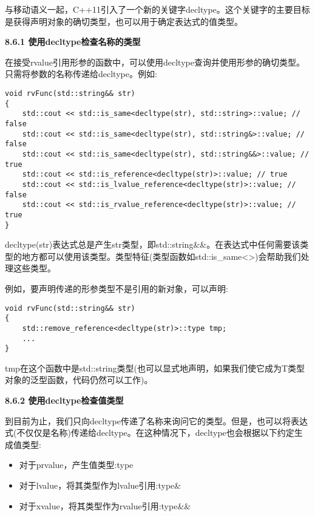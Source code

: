 与移动语义一起，C++11引入了一个新的关键字decltype。这个关键字的主要目标是获得声明对象的确切类型，也可以用于确定表达式的值类型。\par

\hspace*{\fill} \par %
\textbf{8.6.1 使用decltype检查名称的类型}

在接受rvalue引用形参的函数中，可以使用decltype查询并使用形参的确切类型。只需将参数的名称传递给decltype。例如:\par

\begin{lstlisting}[caption={}]
void rvFunc(std::string&& str)
{
	std::cout << std::is_same<decltype(str), std::string>::value; // false
	std::cout << std::is_same<decltype(str), std::string&>::value; // false
	std::cout << std::is_same<decltype(str), std::string&&>::value; // true
	std::cout << std::is_reference<decltype(str)>::value; // true
	std::cout << std::is_lvalue_reference<decltype(str)>::value; // false
	std::cout << std::is_rvalue_reference<decltype(str)>::value; // true
}
\end{lstlisting}

decltype(str)表达式总是产生str类型，即std::string\&\&。在表达式中任何需要该类型的地方都可以使用该类型。类型特征(类型函数如std::is\_same<>)会帮助我们处理这些类型。\par

例如，要声明传递的形参类型不是引用的新对象，可以声明:\par

\begin{lstlisting}[caption={}]
void rvFunc(std::string&& str)
{
	std::remove_reference<decltype(str)>::type tmp;
	...
}
\end{lstlisting}

tmp在这个函数中是std::string类型(也可以显式地声明，如果我们使它成为T类型对象的泛型函数，代码仍然可以工作)。\par

\hspace*{\fill} \par %
\textbf{8.6.2 使用decltype检查值类型}

到目前为止，我们只向decltype传递了名称来询问它的类型。但是，也可以将表达式(不仅仅是名称)传递给decltype。在这种情况下，decltype也会根据以下约定生成值类型:\par

\begin{itemize}
	\item 对于prvalue，产生值类型:type
	\item 对于lvalue，将其类型作为lvalue引用:type\&
	\item 对于xvalue，将其类型作为rvalue引用:type\&\&
\end{itemize}

